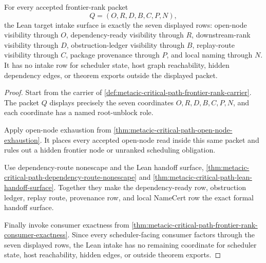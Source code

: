 \begin{theorem}
\label{thm:metacic-critical-path-lean-target-intake}
For every accepted frontier-rank packet
$$
Q=(O,R,D,B,C,P,N),
$$
the Lean target intake surface is exactly the seven displayed rows: open-node visibility through $O$, dependency-ready visibility through $R$, downstream-rank visibility through $D$, obstruction-ledger visibility through $B$, replay-route visibility through $C$, package provenance through $P$, and local naming through $N$. It has no intake row for scheduler state, host graph reachability, hidden dependency edges, or theorem exports outside the displayed packet.
\end{theorem}
\begin{proof}
Start from the carrier of \autoref{def:metacic-critical-path-frontier-rank-carrier}. The packet $Q$ displays precisely the seven coordinates $O,R,D,B,C,P,N$, and each coordinate has a named root-unblock role.

Apply open-node exhaustion from \autoref{thm:metacic-critical-path-open-node-exhaustion}. It places every accepted open-node read inside this same packet and rules out a hidden frontier node or unranked scheduling obligation.

Use dependency-route nonescape and the Lean handoff surface, \autoref{thm:metacic-critical-path-dependency-route-nonescape} and \autoref{thm:metacic-critical-path-lean-handoff-surface}. Together they make the dependency-ready row, obstruction ledger, replay route, provenance row, and local NameCert row the exact formal handoff surface.

Finally invoke consumer exactness from \autoref{thm:metacic-critical-path-frontier-rank-consumer-exactness}. Since every scheduler-facing consumer factors through the seven displayed rows, the Lean intake has no remaining coordinate for scheduler state, host reachability, hidden edges, or outside theorem exports.
\end{proof}

